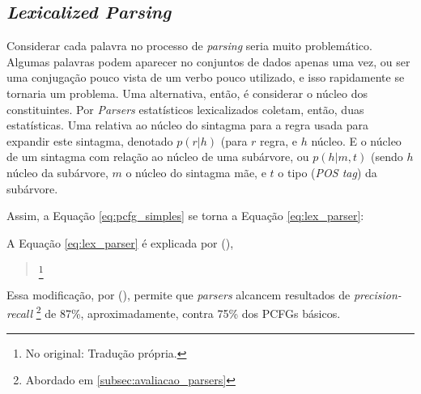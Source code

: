 \subsection{\textit{Lexicalized Parsing}}
\label{subsec:lexParsing}

Considerar cada palavra no processo de \textit{parsing} seria muito problemático. Algumas palavras podem aparecer no conjuntos de dados apenas uma vez, ou ser uma conjugação pouco vista de um verbo pouco utilizado, e isso rapidamente se tornaria um problema. Uma alternativa, então, é considerar o núcleo dos constituintes. Por \cite[p~40]{charniak97statistical} \textit{Parsers} estatísticos lexicalizados coletam, então, duas estatísticas. Uma relativa ao núcleo do sintagma para a regra usada para expandir este sintagma, denotado $p(r|h)$ (para $r$ regra, e $h$ núcleo. E o núcleo de um sintagma com relação ao núcleo de uma subárvore, ou $p(h|m,t)$ (sendo $h$ núcleo da subárvore, $m$ o núcleo do sintagma mãe, e $t$ o tipo (\textit{POS tag}) da subárvore. 

Assim, a Equação \ref{eq:pcfg_simples} se torna a Equação \ref{eq:lex_parser}:
\begin{center}
    
\end{center}

A Equação \ref{eq:lex_parser} é explicada por (\textit{}), 
\begin{quote}
    \footnote{No original:  Tradução própria.}
\end{quote}

Essa modificação, por (\textit{}), permite que \textit{parsers} alcancem resultados de \textit{precision-recall}
\footnote{Abordado em \ref{subsec:avaliacao_parsers}}
de 87\%, aproximadamente, contra 75\% dos PCFGs básicos.